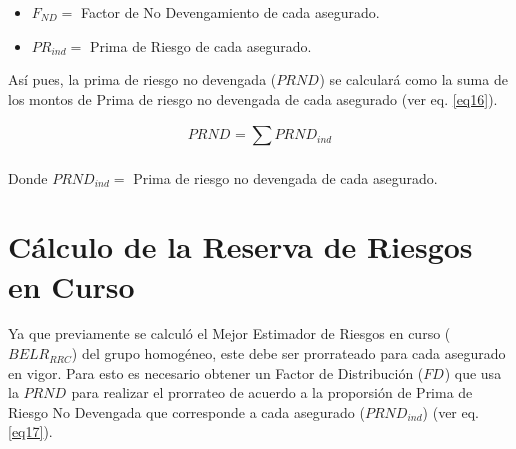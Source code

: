 \documentclass[11pt,twoside,openright,spanish]{report}
\numberwithin{equation}{chapter}
\numberwithin{figure}{chapter}
\numberwithin{table}{chapter}
\begin{document}
\begin{itemize}
	\setlength\itemsep{-0.5em}	 
	
	\item $F_{ND}=$ Factor de No Devengamiento de cada asegurado.
	
	\item $PR_{ind}=$ Prima de Riesgo de cada asegurado.
\end{itemize}

Así pues, la prima de riesgo no devengada ($PRND_{}$) se calculará como la suma de los montos de Prima de riesgo no devengada de cada asegurado (ver eq. \ref{eq16}).

\begin{equation}
	PRND_{}={\sum _{}^{}PRND_{ind}^{}}
	\label{eq16}
\end{equation}


Donde $PRND_{ind}=$ Prima de riesgo no devengada de cada asegurado.


	 
	 	\chapter{Cálculo de la Reserva de Riesgos en Curso}\label{metnum}
	 
	 Ya que previamente se calculó el Mejor Estimador de Riesgos en curso ($BELR_{RRC}$) del grupo homogéneo, este debe ser prorrateado para cada asegurado en vigor. Para esto es necesario obtener un Factor de Distribución ($FD_{}$) que usa la $PRND_{}$ para realizar el prorrateo de acuerdo a la proporsión de Prima de Riesgo No Devengada que corresponde a cada asegurado ($PRND_{ind}$) (ver eq. \ref{eq17}).
	 
\end{document}

